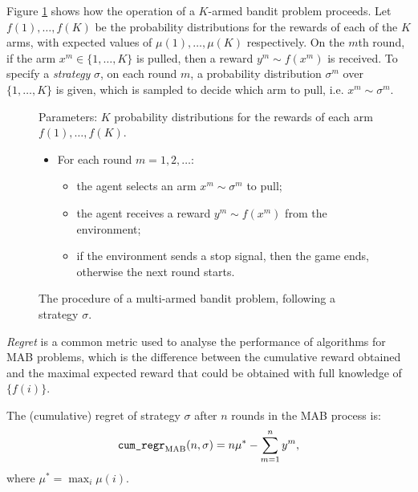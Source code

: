     Figure \ref{fig:2:mab_problem} shows how the operation of a $K$-armed bandit problem proceeds. Let $f(1),\ldots,f(K)$ be the probability distributions for the rewards of each of the $K$ arms, with expected values of $\mu(1),\ldots,\mu(K)$ respectively. On the $m$th round, if the arm $x^m\in\{1,\ldots,K\}$ is pulled, then a reward $y^m\sim f(x^m)$ is received. To specify a \textit{strategy} $\sigma$, on each round $m$, a probability distribution $\sigma^m$ over $\{1,\ldots,K\}$ is given, which is sampled to decide which arm to pull, i.e. $x^m\sim\sigma^m$.

    \begin{figure}
        \begin{tcolorbox}
            Parameters: $K$ probability distributions for the rewards of each arm $f(1),\ldots,f(K)$.
            \begin{itemize}
                \item For each round $m=1,2,\ldots$:
                \begin{itemize}
                    \item the agent selects an arm $x^m\sim\sigma^m$ to pull;
                    \item the agent receives a reward $y^m \sim f(x^m)$ from the environment;
                    \item if the environment sends a stop signal, then the game ends, otherwise the next round starts.
                \end{itemize} 
            \end{itemize}
        \end{tcolorbox}
        \caption{The procedure of a multi-armed bandit problem, following a strategy $\sigma$.}
        \label{fig:2:mab_problem}
    \end{figure}
    
    \textit{Regret} is a common metric used to analyse the performance of algorithms for MAB problems, which is the difference between the cumulative reward obtained and the maximal expected reward that could be obtained with full knowledge of $\{f(i)\}$.

    \begin{defn}
        \label{def:2:cumulative_regret}
        The \textnormal{(cumulative) regret} of strategy $\sigma$ after $n$ rounds in the MAB process is:
        \begin{align}
            {\textnormal{\texttt{cum\_regr}}}_{{\textnormal{MAB}}}(n,\sigma) = n\mu^* - \sum_{m=1}^n y^m, \label{eq:2:cumulative_regret_def}
        \end{align}
        where $\mu^* = \max_i \mu(i)$.
    \end{defn}

